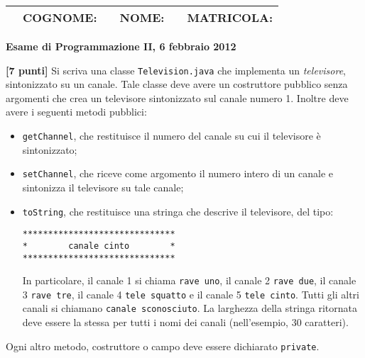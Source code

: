 \documentclass{article}[10pt]
\newcounter{esnu}
\newenvironment{esercizio}{\medskip \noindent {\bf Esercizio\addtocounter{esnu}{1} \arabic{esnu}}}{}
\begin{document}
\begin{tabular}{llclcr}
 \hspace{-35pt} &{\bf COGNOME:} & \hspace{100pt}        &{\bf NOME:}    & \hspace{100pt}        &{\bf MATRICOLA:}\hspace{35pt} \\
\hline
\end{tabular}
\begin{center} {\bf Esame di Programmazione II, 6 febbraio 2012}\end{center}

\begin{esercizio}
\textbf{[7 punti]} Si scriva una classe \texttt{Television.java} che implementa un \emph{televisore},
sintonizzato su un canale. Tale classe deve avere un costruttore pubblico senza argomenti
che crea un televisore sintonizzato sul canale numero 1.
Inoltre deve avere i seguenti metodi pubblici:
%
\begin{itemize}
\item \texttt{getChannel}, che restituisce il numero del canale su cui il televisore
      \`e sintonizzato;
\item \texttt{setChannel}, che riceve come argomento il numero intero di un canale
      e sintonizza il televisore su tale canale;
\item \texttt{toString}, che restituisce una stringa che descrive il televisore, del
      tipo:
\begin{verbatim}
******************************
*        canale cinto        *
******************************
\end{verbatim}
      In particolare, il canale 1 si chiama \texttt{rave uno}, il canale 2
      \texttt{rave due}, il canale 3 \texttt{rave tre}, il canale 4
      \texttt{tele squatto} e il canale 5 \texttt{tele cinto}. Tutti gli altri
      canali si chiamano \texttt{canale sconosciuto}. La larghezza della
      stringa ritornata deve essere la stessa per tutti i nomi dei canali
      (nell'esempio, 30 caratteri).
\end{itemize}
%
Ogni altro metodo, costruttore o campo deve essere dichiarato \texttt{private}.
%
\end{esercizio}
\end{document}
